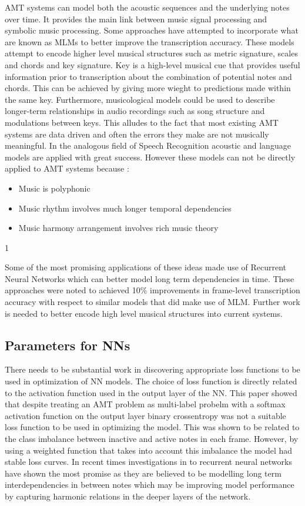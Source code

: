 \ac{AMT} systems can model both the acoustic sequences and the underlying notes over
time. It provides the main link between music signal processing and symbolic
music processing. Some approaches have attempted to incorporate what are known
as \ac{MLM}s to better improve the transcription accuracy. These
models attempt to encode higher level musical structures such as metric
signature, scales and chords and key signature. Key is a high-level musical cue
that provides useful information prior to transcription about the combination of
potential notes and chords. This can be achieved by giving more wieght to
predictions made within the same key. Furthermore, musicological models could be
used to describe longer-term relationships in audio recordings such as song
structure and modulations between keys. This alludes to the fact that most
existing \ac{AMT} systems are data driven and often the errors they make are not
musically meaningful. In the analogous field of Speech Recognition acoustic and
language models are applied with great success. However these models can not be
directly applied to \ac{AMT} systems because :
\begin{itemize}
    \item Music is polyphonic
    \item Music rhythm involves much longer temporal dependencies
    \item Music harmony arrangement involves rich music theory \end{itemize}1

Some of the most promising applications of these ideas made use of Recurrent
Neural Networks which can better model long term dependencies in time. These
approaches were noted to achieved 10\% improvements in frame-level transcription
accuracy with respect to similar models that did make use of \ac{MLM}. Further work
is needed to better encode high level musical structures into current systems.
\cite{amt-note-to-audio:Lewandowski,end-to-end-nn-2016:Sigtia}

\subsection{Parameters for NNs}
There needs to be substantial work in discovering appropriate loss functions to
be used in optimization of \ac{NN} models. The choice of loss function is directly
related to the activation function used in the output layer of the \ac{NN}. This
paper showed that despite treating an AMT problem as multi-label probelm with a
softmax activation function on the output layer binary crossentropy was not a
suitable loss function to be used in optimizing the model. This was shown to be
related to the class imbalance between inactive and active notes in each frame.
However, by using a weighted function that takes into account this imbalance the
model had stable loss curves. In recent times investigations in to recurrent neural networks have shown the
most promise as they are believed to be modelling long term interdependencies in
between notes which may be improving model performance by capturing harmonic
relations in the deeper layers of the network.
\cite{end-to-end-nn-2016:Sigtia,amt-note-to-audio:Lewandowski}


